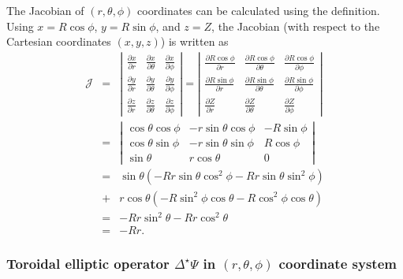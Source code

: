 \documentclass{llncs}
\begin{document}
The Jacobian of $(r, \theta, \phi)$ coordinates can be calculated using the
definition. Using $x = R \cos \phi$, $y = R \sin \phi$, and $z = Z$, the
Jacobian (with respect to the Cartesian coordinates $(x, y, z)$) is written as
\begin{eqnarray}
  \mathcal{J} & = & \left|\begin{array}{ccc}
    \frac{\partial x}{\partial r} & \frac{\partial x}{\partial \theta} &
    \frac{\partial x}{\partial \phi}\\
    \frac{\partial y}{\partial r} & \frac{\partial y}{\partial \theta} &
    \frac{\partial y}{\partial \phi}\\
    \frac{\partial z}{\partial r} & \frac{\partial z}{\partial \theta} &
    \frac{\partial z}{\partial \phi}
  \end{array}\right| = \left|\begin{array}{ccc}
    \frac{\partial R \cos \phi}{\partial r} & \frac{\partial R \cos
    \phi}{\partial \theta} & \frac{\partial R \cos \phi}{\partial \phi}\\
    \frac{\partial R \sin \phi}{\partial r} & \frac{\partial R \sin
    \phi}{\partial \theta} & \frac{\partial R \sin \phi}{\partial \phi}\\
    \frac{\partial Z}{\partial r} & \frac{\partial Z}{\partial \theta} &
    \frac{\partial Z}{\partial \phi}
  \end{array}\right| \nonumber\\
  & = & \left|\begin{array}{ccc}
    \cos \theta \cos \phi & - r \sin \theta \cos \phi & - R \sin \phi\\
    \cos \theta \sin \phi & - r \sin \theta \sin \phi & R \cos \phi\\
    \sin \theta & r \cos \theta & 0
  \end{array}\right| \nonumber\\
  & = & \sin \theta (- R r \sin \theta \cos^2 \phi - R r \sin \theta \sin^2
  \phi) \nonumber\\
  & + & r \cos \theta (- R \sin^2 \phi \cos \theta - R \cos^2 \phi \cos
  \theta) \nonumber\\
  & = & - R r \sin^2 \theta - R r \cos^2 \theta \nonumber\\
  & = & - R r. 
\end{eqnarray}
\subsubsection{Toroidal elliptic operator $\Delta^{\star} \Psi$ in $(r,
\theta, \phi)$ coordinate system}
\end{document}
